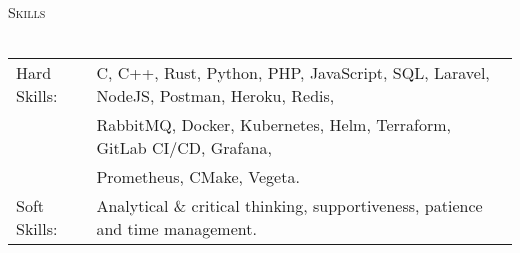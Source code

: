 \documentclass[a4paper]{article}
\newcommand{\lineunder} {
    \vspace*{-8pt} \\
    \hspace*{-18pt} \hrulefill \\
}
\newcommand{\header} [1] {
    {\hspace*{-18pt}\vspace*{6pt} \textsc{#1}}
    \vspace*{-6pt} \lineunder
}
\begin{document}
\







\header{Skills}
\begin{tabular}{ l l }
	Hard Skills:              & C, C++, Rust, Python, PHP, JavaScript, SQL, Laravel, NodeJS, Postman, Heroku, Redis, \\ & RabbitMQ, Docker, Kubernetes, Helm, Terraform, GitLab CI/CD, Grafana, \\ & Prometheus, CMake, Vegeta.\\
	Soft Skills:                    & Analytical \& critical thinking, supportiveness, patience and time management.\\
\end{tabular}
\vspace{2mm}

\ 
\end{document}
